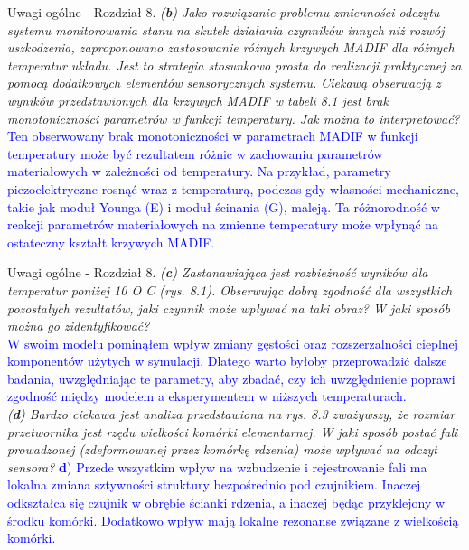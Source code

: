 \documentclass[10pt,aspectratio=169]{beamer} %
\begin{document}
\begin{frame}[label=frame34]{Uwagi ogólne - Rozdział 8.}\justifying
\textit{(\textbf{b}) Jako rozwiązanie problemu zmienności odczytu systemu monitorowania stanu na skutek działania czynników innych niż rozwój uszkodzenia, zaproponowano zastosowanie różnych krzywych MADIF dla różnych temperatur układu. Jest to strategia stosunkowo prosta do realizacji praktycznej za pomocą dodatkowych elementów sensorycznych systemu. Ciekawą obserwacją z wyników przedstawionych dla krzywych MADIF w tabeli 8.1 jest brak monotoniczności parametrów w funkcji temperatury. Jak można to interpretować?}\\ \textcolor{blue}{Ten obserwowany brak monotoniczności w parametrach MADIF w funkcji temperatury może być rezultatem różnic w zachowaniu parametrów materiałowych w zależności od temperatury. Na przykład, parametry piezoelektryczne rosnąć wraz z temperaturą, podczas gdy własności mechaniczne, takie jak moduł Younga (E) i moduł ścinania (G), maleją. Ta różnorodność w reakcji parametrów materiałowych na zmienne temperatury może wpłynąć na ostateczny kształt krzywych MADIF.}
\end{frame}
\begin{frame}[label=frame35]{Uwagi ogólne - Rozdział 8.}\justifying
\textit{(\textbf{c}) Zastanawiająca jest rozbieżność wyników dla temperatur poniżej 10 O C (rys. 8.1).	Obserwując dobrą zgodność dla wszystkich pozostałych rezultatów, jaki czynnik może wpływać na taki obraz? W jaki sposób można go zidentyfikować?}\\
\textcolor{blue}{W swoim modelu pominąłem wpływ zmiany gęstości oraz rozszerzalności cieplnej komponentów użytych w symulacji. Dlatego warto byłoby przeprowadzić dalsze badania, uwzględniając te parametry, aby zbadać, czy ich uwzględnienie poprawi zgodność między modelem a eksperymentem w niższych temperaturach.}\\
\textit{(\textbf{d}) Bardzo ciekawa jest analiza przedstawiona na rys. 8.3 zważywszy, że rozmiar przetwornika jest rzędu wielkości komórki elementarnej. W jaki sposób postać fali prowadzonej (zdeformowanej przez komórkę rdzenia) może wpływać na odczyt sensora?}
\textcolor{blue}{\textbf{d}) Przede wszystkim wpływ na wzbudzenie i rejestrowanie fali ma lokalna zmiana sztywności struktury bezpośrednio pod czujnikiem. Inaczej odkształca się czujnik w obrębie ścianki rdzenia, a inaczej będąc przyklejony w środku komórki. Dodatkowo wpływ mają lokalne rezonanse związane z wielkością komórki.}
\end{frame}
\end{document}

